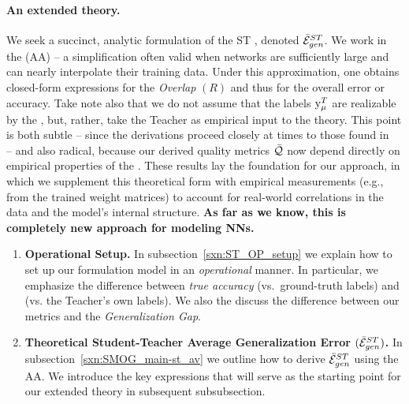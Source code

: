 \paragraph{An extended theory.} We seek a succinct, analytic formulation of the ST \AverageGeneralizationError, denoted $\bar{\mathcal{E}}^{ST}_{gen}$.  
We work in the \AnnealedApproximation (AA) -- a simplification often valid when networks are sufficiently large and can nearly interpolate their training data. 
Under this approximation, one obtains closed-form expressions for the \StudentTeacher \emph{Overlap} $(R)$
and thus for the \Teacher overall error or accuracy.  
Take note also that we do not assume that the labels $\mathrm{y}_{\mu}^{T}$ are realizable by the \Teacher, but, rather,
take the Teacher as empirical input to the theory.  
This point is both subtle -- since the derivations  proceed closely at times to those found in~\cite{engel2001statistical,EngelAndVanDenBroeck,SST90,SST92}
-- and also radical, because our derived quality metrics $\bar{\mathcal{Q}}$ now
depend directly on empirical properties of the \Teacher.
These results lay the foundation for our \emph{\SemiEmpirical} approach, in which we supplement this theoretical form with empirical measurements (e.g., from the trained weight matrices) to account for real-world correlations in the data and the model’s internal structure.  
\textbf{As far as we know, this is completely new \SemiEmpirical approach for modeling NNs.}


\begin{enumerate}[label=4.3.\arabic*]
\item
  \textbf{Operational Setup.}
  In subsection~\ref{sxn:ST_OP_setup} we explain how to set up our formulation\StudentTeacher
  model in an \emph{operational} manner. 
  In particular, we emphasize the difference between \emph{true accuracy} (vs.\ ground-truth labels)
  and \Precision (vs. the Teacher’s own labels). We also the discuss the difference between
  our \Quality metrics and the \emph{Generalization Gap}.

  \item
    \textbf{Theoretical Student-Teacher Average Generalization Error $(\bar{\mathcal{E}}^{ST}_{gen})$.}
    In subsection~\ref{sxn:SMOG_main-st_av}  we outline how to derive $\bar{\mathcal{E}}^{ST}_{gen}$ using the AA.  
    We introduce the key expressions that will serve as the starting point for our extended \SemiEmpirical theory in subsequent subsubsection.
\end{enumerate}



\clearpage
